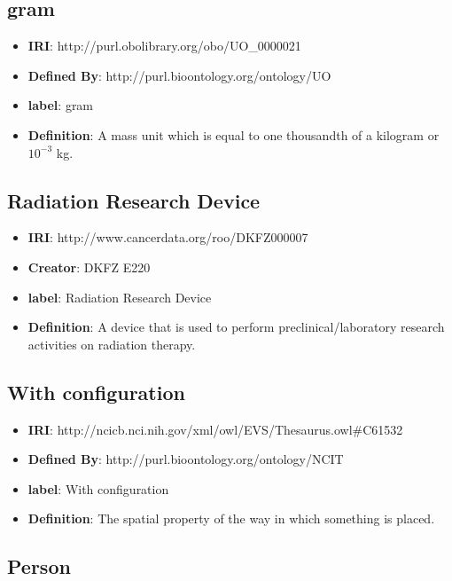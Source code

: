 \documentclass[a4paper,12pt,oneside]{article}
\begin{document}
  \subsection {gram}

  \begin{itemize}
     \item \textbf{IRI}: http://purl.obolibrary.org/obo/UO\_0000021
     \item \textbf{Defined By}: http://purl.bioontology.org/ontology/UO
     \item \textbf{label}: gram
     \item \textbf{Definition}: A mass unit which is equal to one thousandth of a kilogram or $10^{-3}$ kg.
  \end{itemize}
  
  \subsection{Radiation Research Device}

\begin{itemize}
	\item \textbf{IRI}: http://www.cancerdata.org/roo/DKFZ000007
	\item \textbf{Creator}: DKFZ E220
	\item \textbf{label}: Radiation Research Device
	\item \textbf{Definition}: A device that is used to perform preclinical/laboratory research activities on radiation therapy.
\end{itemize}
  
  \subsection{With configuration}

\begin{itemize}
	\item \textbf{IRI}: http://ncicb.nci.nih.gov/xml/owl/EVS/Thesaurus.owl\#C61532
	\item \textbf{Defined By}: http://purl.bioontology.org/ontology/NCIT
	\item \textbf{label}: With configuration
	\item \textbf{Definition}: The spatial property of the way in which something is placed.
\end{itemize}

  \subsection{Person}
\end{document}
